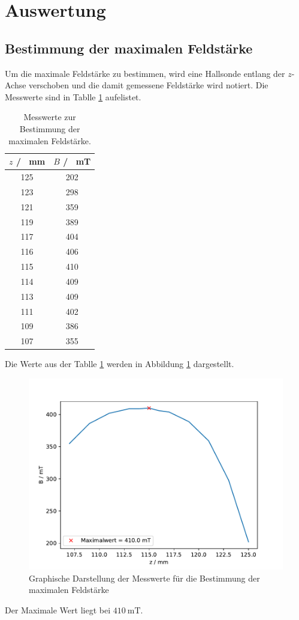\section{Auswertung}
\label{sec:Auswertung}
\subsection{Bestimmung der maximalen Feldstärke}
Um die maximale Feldstärke zu bestimmen, wird eine Hallsonde entlang der $z$-Achse verschoben und die damit gemessene 
Feldstärke wird notiert.
Die Messwerte sind in Tablle \ref{tab:Feldstärke} aufelistet.
\FloatBarrier
\begin{table}
  \centering
  \begin{tabular}{c c}
    \toprule
    $z$ / \SI{}{\milli\meter}& $B$ / \SI{}{\milli\tesla}\\
    \midrule
    125& 202\\     
    123& 298\\
    121& 359\\
    119& 389\\
    117& 404\\
    116& 406\\
    115& 410\\
    114& 409\\
    113& 409\\
    111& 402\\
    109& 386\\
    107& 355\\
    \bottomrule
  \end{tabular}
  \caption{Messwerte zur Bestimmung der maximalen Feldstärke.}
  \label{tab:Feldstärke}
\end{table}
\FloatBarrier
Die Werte aus der Tablle \ref{tab:Feldstärke} werden in Abbildung \ref{fig:Feldstärke} dargestellt.
\FloatBarrier
\begin{figure}
  \centering
  \includegraphics[width = \textwidth, keepaspectratio]{figure/BFeld_plot.pdf}
  \caption{Graphische Darstellung der Messwerte für die Bestimmung der maximalen Feldstärke}
  \label{fig:Feldstärke}
\end{figure}
\FloatBarrier
Der Maximale Wert liegt bei $\SI{410}{\milli\tesla}$. 

